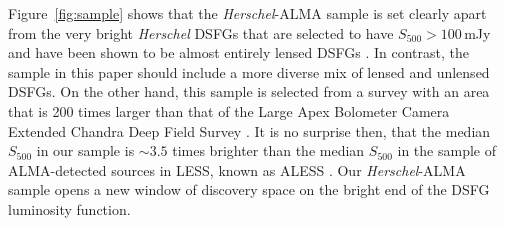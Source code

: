 \documentclass[iop]{emulateapj}
\begin{document}

Figure~\ref{fig:sample} shows that the {\it Herschel}-ALMA sample is set
clearly apart from the very bright {\it Herschel} DSFGs that are selected to
have $S_{500} > 100 \, $mJy and have been shown to be almost entirely lensed
DSFGs \citep{Negrello:2010fk, Wardlow:2013lr, Bussmann:2013lr}.  In contrast,
the sample in this paper should include a more diverse mix of lensed and
unlensed DSFGs.  On the other hand, this sample is selected from a survey with
an area that is 200 times larger than that of the Large Apex Bolometer Camera
Extended Chandra Deep Field Survey \citep[LESS][]{Weis:2009ly}.  It is no
surprise then, that the median $S_{500}$ in our sample is $\sim3.5$ times
brighter than the median $S_{500}$ in the sample of ALMA-detected sources in
LESS, known as ALESS \citep{Hodge:2013qy}.  Our {\it Herschel}-ALMA sample
opens a new window of discovery space on the bright end of the DSFG luminosity
function.
\end{document}
